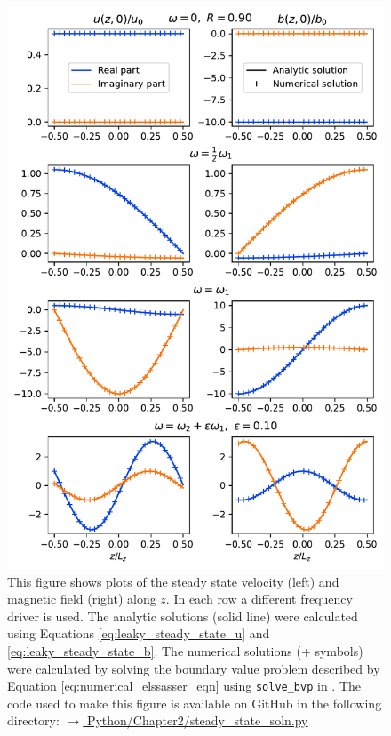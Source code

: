 \begin{figure}
    \centering
    \vspace{-30pt}
    \includegraphics[width=\textwidth,height=0.95\textheight,keepaspectratio]{figures/chapter02/steady_state_soln_along_z.pdf}
    \vspace{-10pt}
    \caption{This figure shows plots of the steady state velocity (left) and magnetic field (right) along $z$. In each row a different frequency driver is used. The analytic solutions (solid line) were calculated using Equations \eqref{eq:leaky_steady_state_u} and \eqref{eq:leaky_steady_state_b}. The numerical solutions (+ symbols) were calculated by solving the boundary value problem described by Equation \eqref{eq:numerical_elssasser_eqn} using \texttt{solve\_bvp} in \citet{SciPy2020}. The code used to make this figure is available on GitHub in the following directory:\newline
    \href{https://github.com/aleksyprok/apkp_thesis/blob/main/Python/Chapter2/steady_state_soln.py}{$\rightarrow$ Python/Chapter2/steady\_state\_soln.py}}
    \vspace{-30pt}
    \label{fig:steady_state_soln_along_z}
\end{figure}

